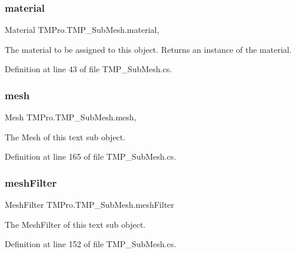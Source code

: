 \subsubsection{\texorpdfstring{material}{material}}
{\footnotesize\ttfamily Material T\+M\+Pro.\+T\+M\+P\+\_\+\+Sub\+Mesh.\+material\hspace{0.3cm}{\ttfamily [get]}, {\ttfamily [set]}}



The material to be assigned to this object. Returns an instance of the material. 



Definition at line 43 of file T\+M\+P\+\_\+\+Sub\+Mesh.\+cs.

\mbox{\label{class_t_m_pro_1_1_t_m_p___sub_mesh_ad6a306d193c7be147604ca07bbd9eb8b}} 
\subsubsection{\texorpdfstring{mesh}{mesh}}
{\footnotesize\ttfamily Mesh T\+M\+Pro.\+T\+M\+P\+\_\+\+Sub\+Mesh.\+mesh\hspace{0.3cm}{\ttfamily [get]}, {\ttfamily [set]}}



The Mesh of this text sub object. 



Definition at line 165 of file T\+M\+P\+\_\+\+Sub\+Mesh.\+cs.

\mbox{\label{class_t_m_pro_1_1_t_m_p___sub_mesh_aa4bffef3b3907fab7cf2b3c7c632af3b}} 
\subsubsection{\texorpdfstring{meshFilter}{meshFilter}}
{\footnotesize\ttfamily Mesh\+Filter T\+M\+Pro.\+T\+M\+P\+\_\+\+Sub\+Mesh.\+mesh\+Filter\hspace{0.3cm}{\ttfamily [get]}}



The Mesh\+Filter of this text sub object. 



Definition at line 152 of file T\+M\+P\+\_\+\+Sub\+Mesh.\+cs.

